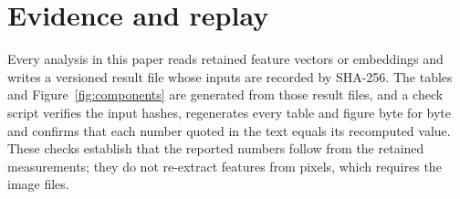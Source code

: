 \section{Evidence and replay}\label{app:replay}

Every analysis in this paper reads retained feature vectors or embeddings and writes a
versioned result file whose inputs are recorded by SHA-256. The tables and
Figure~\ref{fig:components} are generated from those result files, and a check script
verifies the input hashes, regenerates every table and figure byte for byte and
confirms that each number quoted in the text equals its recomputed value. These
checks establish that the reported numbers follow from the retained measurements; they
do not re-extract features from pixels, which requires the image files.
